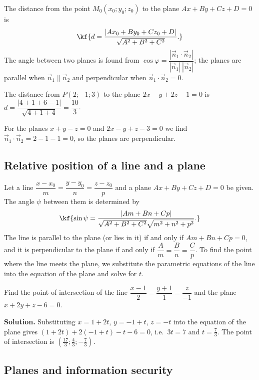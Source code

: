 \begin{teorema}
The distance from the point $M_0(x_0;y_0;z_0)$ to the plane $Ax+By+Cz+D=0$ is
\[\kf{d=\frac{|Ax_0+By_0+Cz_0+D|}{\sqrt{A^2+B^2+C^2}}.}\]
The angle between two planes is found from
$\cos\varphi=\dfrac{|\vec n_1\cdot\vec n_2|}{|\vec n_1|\,|\vec n_2|}$;
the planes are parallel when $\vec n_1\parallel\vec n_2$ and perpendicular when
$\vec n_1\cdot\vec n_2=0$.
\end{teorema}

\begin{misol}
The distance from $P(2;-1;3)$ to the plane $2x-y+2z-1=0$ is
$d=\dfrac{|4+1+6-1|}{\sqrt{4+1+4}}=\dfrac{10}{3}$.
\end{misol}

\begin{misol}
For the planes $x+y-z=0$ and $2x-y+z-3=0$ we find
$\vec n_1\cdot\vec n_2=2-1-1=0$, so the planes are perpendicular.
\end{misol}

\subsection{Relative position of a line and a plane}

Let a line $\dfrac{x-x_0}{m}=\dfrac{y-y_0}{n}=\dfrac{z-z_0}{p}$ and a plane
$Ax+By+Cz+D=0$ be given. The angle $\psi$ between them is determined by
\[\kf{\sin\psi=\frac{|Am+Bn+Cp|}{\sqrt{A^2+B^2+C^2}\sqrt{m^2+n^2+p^2}}.}\]
The line is parallel to the plane (or lies in it) if and only if
$Am+Bn+Cp=0$, and it is perpendicular to the plane if and only if
$\dfrac{A}{m}=\dfrac{B}{n}=\dfrac{C}{p}$.
To find the point where the line meets the plane, we substitute the parametric
equations of the line into the equation of the plane and solve for $t$.

\begin{misol}
Find the point of intersection of the line
$\dfrac{x-1}{2}=\dfrac{y+1}{1}=\dfrac{z}{-1}$ and the plane $x+2y+z-6=0$.

\textbf{Solution.} Substituting $x=1+2t$, $y=-1+t$, $z=-t$ into the equation
of the plane gives $(1+2t)+2(-1+t)-t-6=0$, i.e.\ $3t=7$ and $t=\frac73$.
The point of intersection is $\left(\frac{17}{3};\frac43;-\frac73\right)$.
\end{misol}

\subsection{Planes and information security}

